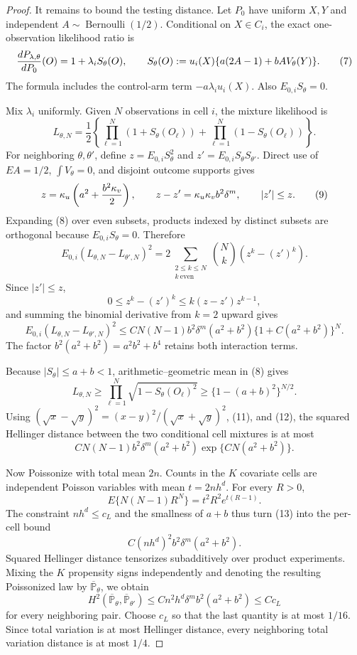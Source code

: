 \documentclass{article}
\begin{document}
\begin{proof}
It remains to bound the testing distance.  Let \(P_0\) have uniform \(X,Y\) and independent \(A\sim\operatorname{Bernoulli}(1/2)\).  Conditional on \(X\in C_i\), the exact one-observation likelihood ratio is
\[
 {dP_{\lambda,\theta}\over dP_0}(O)
 =1+\lambda_iS_\theta(O),\qquad
 S_\theta(O):=u_i(X)\{a(2A-1)+bA V_\theta(Y)\}.
 \tag{7}
\]
The formula includes the control-arm term \(-a\lambda_i u_i(X)\).  Also \(E_{0,i}S_\theta=0\).

Mix \(\lambda_i\) uniformly.  Given \(N\) observations in cell \(i\), the mixture likelihood is
\[
 L_{\theta,N}=\frac12\left\{\prod_{\ell=1}^N(1+S_\theta(O_\ell))
                      +\prod_{\ell=1}^N(1-S_\theta(O_\ell))\right\}.
 \tag{8}
\]
For neighboring \(\theta,\theta'\), define \(z=E_{0,i}S_\theta^2\) and \(z'=E_{0,i}S_\theta S_{\theta'}\).  Direct use of \(E A=1/2\), \(\int V_\theta=0\), and disjoint outcome supports gives
\[
 z=\kappa_u\left(a^2+{b^2\kappa_v\over2}\right),\qquad
 z-z'=\kappa_u\kappa_v b^2\delta^m,\qquad |z'|\leq z.
 \tag{9}
\]
Expanding (8) over even subsets, products indexed by distinct subsets are orthogonal because \(E_{0,i}S_\theta=0\).  Therefore
\[
 E_{0,i}(L_{\theta,N}-L_{\theta',N})^2
 =2\sum_{\substack{2\leq k\leq N\\ k\ \mathrm{even}}}{N\choose k}(z^k-(z')^k).
 \tag{10}
\]
Since \(|z'|\leq z\),
\[
 0\leq z^k-(z')^k\leq k(z-z')z^{k-1},
\]
and summing the binomial derivative from \(k=2\) upward gives
\[
 E_{0,i}(L_{\theta,N}-L_{\theta',N})^2
 \leq C N(N-1)b^2\delta^m(a^2+b^2)
          \{1+C(a^2+b^2)\}^{N}.
 \tag{11}
\]
The factor \(b^2(a^2+b^2)=a^2b^2+b^4\) retains both interaction terms.

Because \(|S_\theta|\leq a+b<1\), arithmetic--geometric mean in (8) gives
\[
 L_{\theta,N}\geq
 \prod_{\ell=1}^N\sqrt{1-S_\theta(O_\ell)^2}
 \geq\{1-(a+b)^2\}^{N/2}.
 \tag{12}
\]
Using \((\sqrt x-\sqrt y)^2=(x-y)^2/(\sqrt x+\sqrt y)^2\), (11), and (12), the squared Hellinger distance between the two conditional cell mixtures is at most
\[
 C N(N-1)b^2\delta^m(a^2+b^2)
       \exp\{CN(a^2+b^2)\}.
 \tag{13}
\]

Now Poissonize with total mean \(2n\).  Counts in the \(K\) covariate cells are independent Poisson variables with mean \(t=2nh^d\).  For every \(R>0\),
\[
 E\{N(N-1)R^N\}=t^2R^2e^{t(R-1)}.
\]
The constraint \(nh^d\leq c_L\) and the smallness of \(a+b\) thus turn (13) into the per-cell bound
\[
 C( nh^d)^2b^2\delta^m(a^2+b^2).
\]
Squared Hellinger distance tensorizes subadditively over product experiments.  Mixing the \(K\) propensity signs independently and denoting the resulting Poissonized law by \(\overline{\mathbb P}_\theta\), we obtain
\[
 H^2(\overline{\mathbb P}_\theta,
     \overline{\mathbb P}_{\theta'})
 \leq Cn^2h^d\delta^m b^2(a^2+b^2)
 \leq Cc_L
 \tag{14}
\]
for every neighboring pair.  Choose \(c_L\) so that the last quantity is at most \(1/16\).  Since total variation is at most Hellinger distance, every neighboring total variation distance is at most \(1/4\).


\end{proof}
\end{document}
